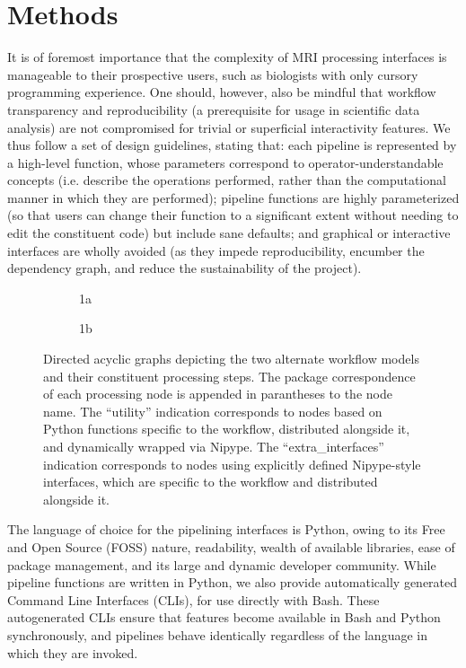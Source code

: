 \section{Methods}
It is of foremost importance that the complexity of MRI processing interfaces is manageable to their prospective users, such as biologists with only cursory programming experience.
One should, however, also be mindful that workflow transparency and reproducibility (a prerequisite for usage in scientific data analysis) are not compromised for trivial or superficial interactivity features. 
We thus follow  a set of design guidelines, stating that:
each pipeline is represented by a high-level function, whose parameters correspond to operator-understandable concepts (i.e. describe the operations performed, rather than the computational manner in which they are performed); 
pipeline functions are highly parameterized (so that users can change their function to a significant extent without needing to edit the constituent code) but include sane defaults;
and graphical or interactive interfaces are wholly avoided (as they impede reproducibility, encumber the dependency graph, and reduce the sustainability of the project).

\begin{figure*}[h]
	\begin{subfigure}{.67\textwidth}
		\centering
		\vspace{.55em}
		\caption{1a}
		\label{fig:wfgg}
	\end{subfigure}%
	\begin{subfigure}{.33\textwidth}
		\centering
		\caption{1b}
		\label{fig:wfgl}
	\end{subfigure}
	\caption{
		Directed acyclic graphs depicting the two alternate workflow models and their constituent processing steps.
		The package correspondence of each processing node is appended in parantheses to the node name.
		The “utility” indication corresponds to nodes based on Python functions specific to the workflow, distributed alongside it, and dynamically wrapped via Nipype.
		The “extra\_interfaces” indication corresponds to nodes using explicitly defined Nipype-style interfaces, which are specific to the workflow and distributed alongside it.
		}
	\label{fig:wfg}
\end{figure*}

The language of choice for the pipelining interfaces is Python, owing to its Free and Open Source (FOSS) nature, readability, wealth of available libraries, ease of package management, and its large and dynamic developer community.
While pipeline functions are written in Python, we also provide automatically generated Command Line Interfaces (CLIs), for use directly with Bash.
These autogenerated CLIs ensure that features become available in Bash and Python synchronously, and pipelines behave identically regardless of the language in which they are invoked.

